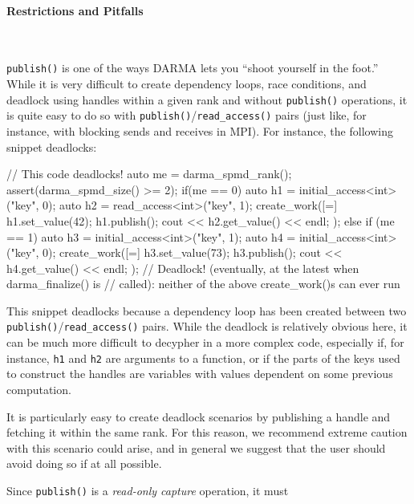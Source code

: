 \paragraph{Restrictions and Pitfalls}\mbox{}\\
\begin{compactitem}
  \item \texttt{publish()} is one of the ways DARMA lets you ``shoot yourself in
  the foot.''  While it is very difficult to create dependency loops, race
  conditions, and deadlock using handles within a given rank and without
  \texttt{publish()} operations, it is quite easy to do so with
  \texttt{publish()}/\texttt{read\_access()} pairs (just like, for instance,
  with blocking sends and receives in MPI).  For instance, the following snippet
  deadlocks:
  \begin{CppCode}
// This code deadlocks!
auto me = darma_spmd_rank();
assert(darma_spmd_size() >= 2);
if(me == 0) {
  auto h1 = initial_access<int>("key", 0);
  auto h2 = read_access<int>("key", 1);
  create_work([=]{ 
    h1.set_value(42);
    h1.publish();
    cout << h2.get_value() << endl;
  }); 
}
else if (me == 1) {
  auto h3 = initial_access<int>("key", 1);
  auto h4 = initial_access<int>("key", 0);
  create_work([=]{ 
    h3.set_value(73);
    h3.publish();
    cout << h4.get_value() << endl; 
  }); 
}
// Deadlock! (eventually, at the latest when darma_finalize() is
// called): neither of the above create_work()s can ever run
  \end{CppCode}
  This snippet deadlocks because a dependency loop has been created between two
  \texttt{publish()}/\texttt{read\_access()} pairs. While the deadlock is
  relatively obvious here, it can be much more difficult to decypher in a more
  complex code, especially if, for instance, \texttt{h1} and \texttt{h2} are
  arguments to a function, or if the parts of the keys used to construct the
  handles are variables with values dependent on some previous computation.
  \item It is particularly easy to create deadlock scenarios by publishing a
  handle and fetching it within the same rank.  For this reason, we recommend
  extreme caution with this scenario could arise, and in general we suggest that
  the user should avoid doing so if at all possible.
  \item Since \texttt{publish()} is a {\it read-only capture} operation, it must

\end{compactitem}
